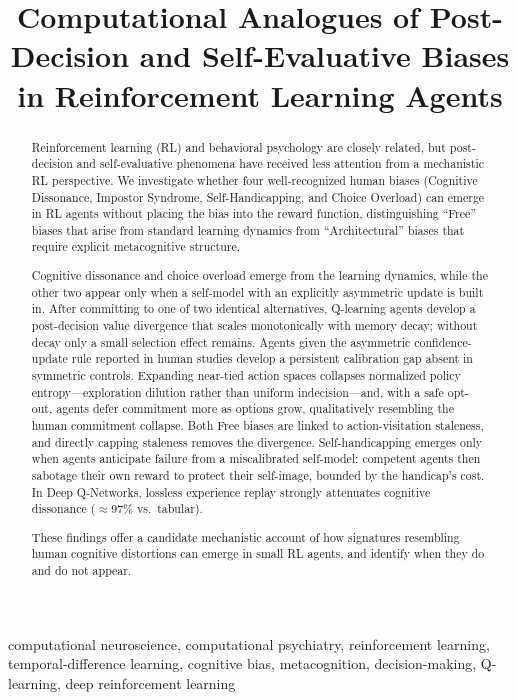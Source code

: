 \documentclass[conference]{IEEEtran}
\title{Computational Analogues of Post-Decision and Self-Evaluative Biases in Reinforcement Learning Agents}
\author{%
\IEEEauthorblockN{Ronak Daniel}
\IEEEauthorblockA{\textit{Dept.\ of Artificial Intelligence}\\
\textit{MPSTME, NMIMS University}\\
Mumbai, India\\
ronak.daniel27@nmims.in}
\and
\IEEEauthorblockN{Avinash Tandle}
\IEEEauthorblockA{\textit{Dept.\ of Electronics and Telecommunication}\\
\textit{MPSTME, NMIMS University}\\
Mumbai, India\\
avinash.tandle@nmims.edu}}
\begin{document}
\maketitle

\begin{abstract}
Reinforcement learning (RL) and behavioral psychology are closely related, but post-decision and self-evaluative phenomena have received less attention from a mechanistic RL perspective.
We investigate whether four well-recognized human biases (Cognitive Dissonance, Impostor Syndrome, Self-Handicapping, and Choice Overload) can emerge in RL agents without placing the bias into the reward function, distinguishing “Free” biases that arise from standard learning dynamics from “Architectural” biases that require explicit metacognitive structure.

Cognitive dissonance and choice overload emerge from the learning dynamics, while the other two appear only when a self-model with an explicitly asymmetric update is built in. After committing to one of two identical alternatives, Q-learning agents develop a post-decision value divergence that scales monotonically with memory decay; without decay only a small selection effect remains. Agents given the asymmetric confidence-update rule reported in human studies develop a persistent calibration gap absent in symmetric controls. Expanding near-tied action spaces collapses normalized policy entropy---exploration dilution rather than uniform indecision---and, with a safe opt-out, agents defer commitment more as options grow, qualitatively resembling the human commitment collapse. Both Free biases are linked to action-visitation staleness, and directly capping staleness removes the divergence. Self-handicapping emerges only when agents anticipate failure from a miscalibrated self-model: competent agents then sabotage their own reward to protect their self-image, bounded by the handicap's cost. In Deep Q-Networks, lossless experience replay strongly attenuates cognitive dissonance ($\approx97\%$ vs.\ tabular).

These findings offer a candidate mechanistic account of how signatures resembling human cognitive distortions can emerge in small RL agents, and identify when they do and do not appear.
\end{abstract}

\begin{IEEEkeywords}
computational neuroscience, computational psychiatry, reinforcement learning, temporal-difference learning, cognitive bias, metacognition, decision-making, Q-learning, deep reinforcement learning
\end{IEEEkeywords}
\end{document}
